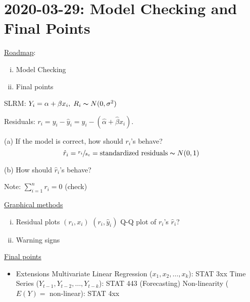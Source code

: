 \section{2020-03-29: Model Checking and Final Points}
\underline{Roadmap}:
\begin{enumerate}[(i)]
    \item Model Checking
    \item Final points
\end{enumerate}
SLRM: $ Y_i = \alpha+\beta x_i,\; R_i \thicksim N(0,\sigma^2) $

Residuals: $ r_i=y_i-\hat{y}_i=y_i-(\hat{\alpha}+\hat{\beta}x_i) $.

(a) If the model is correct, how should $ r_i $'s behave?
\[ \hat{r}_i=\sfrac{r_i}{s_e}=\text{standardized residuals}
    \thicksim N(0,1) \]

(b) How should $ \hat{r}_i $'s behave?

Note: $ \sum\limits_{i=1}^{n} r_i=0 $ (check)

\underline{Graphical methods}
\begin{enumerate}[(i)]
    \item Residual plots
          \subitem $ (r_i,x_i) $
          \subitem $ (r_i,\hat{y}_i) $
          \subitem Q-Q plot of $ r_i $'s
          \subitem $ \hat{r}_i $?
    \item Warning signs
\end{enumerate}
\underline{Final points}
\begin{itemize}
    \item Extensions
          \subitem Multivariate Linear Regression ($ x_1,x_2,\ldots ,x_k $): STAT 3xx
          \subitem Time Series ($ Y_{t-1},Y_{t-2},\ldots ,Y_{t-k} $): STAT 443 (Forecasting)
          \subitem Non-linearity ($ E(Y)= $ non-linear): STAT 4xx
\end{itemize}
